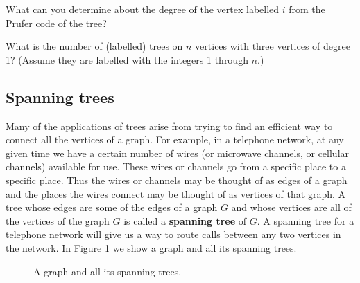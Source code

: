 \itemi What can you determine about the degree of
the vertex labelled $i$ from the Prufer code of the tree?

\itemi What is the number of (labelled) trees on $n$ vertices with three
vertices of degree 1? (Assume they are labelled with the integers 1
through $n$.)




\ep
\subsection{Spanning trees}

Many of the applications of trees arise from trying to find an efficient
way to connect all the vertices of a graph.  For example, in a telephone
network, at any given time we have a certain number of wires (or
microwave channels, or cellular channels) available for use.  These wires
or channels go from a specific place to a specific place. Thus the wires
or channels may be thought of as edges of a graph and the places the wires
connect may be thought of as vertices of that graph.  A tree whose edges
are some of the edges of a graph $G$ and whose vertices are all of the
vertices of the graph $G$ is called a {\bf spanning tree} of $G$.  A spanning tree for a telephone
network will give us a way to route calls between any two vertices in the
network. In Figure \ref{spanningtrees} we show a graph and all its
spanning trees.
\begin{figure}[htb]\caption{A graph
and all its spanning trees.}\label{spanningtrees}
\begin{center}\mbox{}\end{center}\end{figure}


